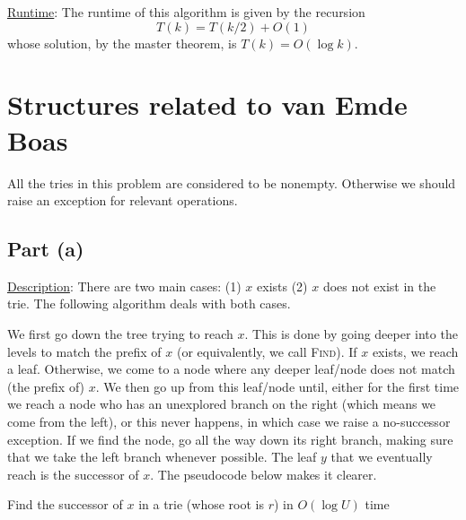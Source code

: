 \documentclass{article}
\begin{document}
\noindent\underline{Runtime}: The runtime of this algorithm is given by the recursion
\begin{equation*}
T(k)=T(k/2)+O(1)
\end{equation*}
whose solution, by the master theorem, is $T(k)=O(\log k)$.

\section{Structures related to van Emde Boas}
All the tries in this problem are considered to be nonempty. Otherwise we should raise an exception for relevant operations.

\subsection{Part (a)}
\noindent\underline{Description}: There are two main cases: (1) $x$ exists (2) $x$ does not exist in the trie. The following algorithm deals with both cases.

We first go down the tree trying to reach $x$. This is done by going deeper into the levels to match the prefix of $x$ (or equivalently, we call \textsc{Find}). If $x$ exists, we reach a leaf. Otherwise, we come to a node where any deeper leaf/node does not match (the prefix of) $x$. We then go up from this leaf/node until, either for the first time we reach a node who has an unexplored branch on the right (which means we come from the left), or this never happens, in which case we raise a no-successor exception. If we find the node, go all the way down its right branch, making sure that we take the left branch whenever possible. The leaf $y$ that we eventually reach is the successor of $x$. The pseudocode below makes it clearer.
\begin{algorithm}
\caption{Find the successor of $x$ in a trie (whose root is $r$) in $O(\log U)$ time}
\begin{algorithmic}[1]
\State{}
\Else{}
\EndIf
\EndProcedure
\end{algorithmic}
\end{algorithm}
\end{document}
